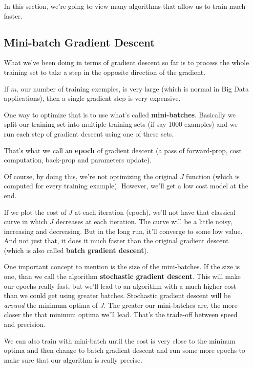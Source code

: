 \documentclass[12pt, a4paper, oneside]{book}
\begin{document}
In this section, we're going to view many algorithms that allow us to train much
faster.

\subsection{Mini-batch Gradient Descent}%
\label{sub:mini_batch_gradient_descent}

What we've been doing in terms of gradient descent so far is to process the
whole training set to take a step in the opposite direction of the gradient.

If $m$, our number of training exemples, is very large (which is normal in Big
Data applications), then a single gradient step is very expensive.

One way to optimize that is to use what's called \textbf{mini-batches}.
Basically we split our training set into multiple training sets (if say $1000$
examples) and we run each step of gradient descent using one of these sets.

That's what we call an \textbf{epoch} of gradient descent (a pass of
forward-prop, cost computation, back-prop and parameters update).

Of course, by doing this, we're not optimizing the original $J$ function (which
is computed for every training example). However, we'll get a low cost model at
the end.

If we plot the cost of $J$ at each iteration (epoch), we'll not have that
classical curve in which $J$ decreases at each iteration. The curve will be a
little noisy, increasing and decreasing. But in the long run, it'll converge to
some low value. And not just that, it does it much faster than the original
gradient descent (which is also called \textbf{batch gradient descent}).

One important concept to mention is the size of the mini-batches. If the size is
one, than we call the algorithm \textbf{stochastic gradient descent}. This will
make our epochs really fast, but we'll lead to an algorithm with a much higher
cost than we could get using greater batches. Stochastic gradient descent will
be \textit{around} the minimum optima of $J$. The greater our mini-batches are,
the more closer the that mininum optima we'll lead. That's the trade-off between
speed and precision.

We can also train with mini-batch until the cost is very close to the mininum
optima and then change to batch gradient descent and run some more epochs to
make sure that our algorithm is really precise.
\end{document}
